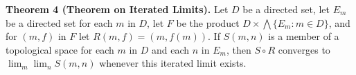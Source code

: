 \textbf{Theorem 4 (Theorem on Iterated Limits).} Let $D$ be a directed set, let $E_m$ be a directed set for each $m$ in $D$, let $F$ be the product $D \times \bigwedge \{E_m : m \in D\}$, and for $(m, f)$ in $F$ let $R(m, f) = (m, f(m))$. If $S(m, n)$ is a member of a topological space for each $m$ in $D$ and each $n$ in $E_m$, then $S \circ R$ converges to $\lim_m \lim_n S(m, n)$ whenever this iterated limit exists.
